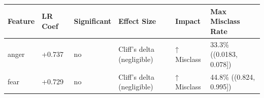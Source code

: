 \begin{tabular}{llllll}
\toprule
Feature & LR Coef & Significant & Effect Size & Impact & Max Misclass Rate \\
\midrule
anger & +0.737 & no & Cliff's delta (negligible) & ↑ Misclass & 33.3\% ((0.0183, 0.078]) \\
fear & +0.729 & no & Cliff's delta (negligible) & ↑ Misclass & 44.8\% ((0.824, 0.995]) \\
\bottomrule
\end{tabular}
